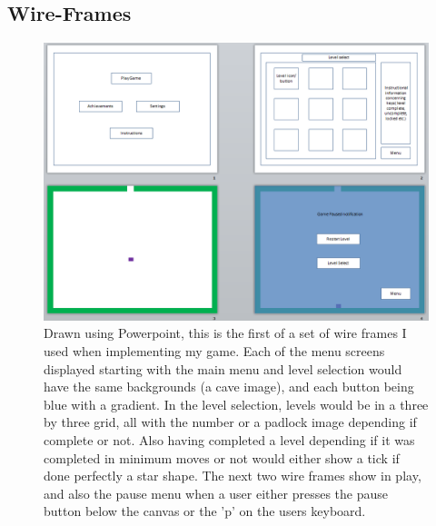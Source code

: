 \documentclass[a4paper]{article}
\begin{document}
\subsection{Wire-Frames}
\begin{figure}[!ht]
   \centering
   \includegraphics[scale=0.6]{wire1.png}
  \caption{Drawn using Powerpoint, this is the first of a set of wire frames I
used when implementing my game. Each of the menu screens displayed starting
with the main menu and level selection would have the same backgrounds (a cave
image), and each button being blue with a gradient. In the level selection,
levels would be in a three by three grid, all with the number or a padlock image
depending if complete or not. Also having completed a level depending if it was
completed in minimum moves or not would either show a tick if done perfectly a
star shape. The next two wire frames show in play, and also the pause menu when
a user either presses the pause button below the canvas or the 'p' on the users
keyboard.}
   \end{figure}
\end{document}
